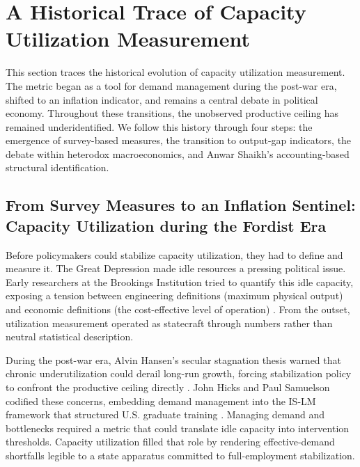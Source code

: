 \documentclass[11pt]{article}
\begin{document}
\section{A Historical Trace of Capacity Utilization Measurement}
\label{sec:literature_review}

This section traces the historical evolution of capacity utilization measurement. The metric began as a tool for demand management during the post-war era, shifted to an inflation indicator, and remains a central debate in political economy. Throughout these transitions, the unobserved productive ceiling has remained underidentified. We follow this history through four steps: the emergence of survey-based measures, the transition to output-gap indicators, the debate within heterodox macroeconomics, and Anwar Shaikh’s accounting-based structural identification.

\subsection{From Survey Measures to an Inflation Sentinel: Capacity Utilization during the Fordist Era}
\label{subsec:fordist_survey_statecraft}

Before policymakers could stabilize capacity utilization, they had to define and measure it. The Great Depression made idle resources a pressing political issue. Early researchers at the Brookings Institution tried to quantify this idle capacity, exposing a tension between engineering definitions (maximum physical output) and economic definitions (the cost-effective level of operation) \citep{Burns1954, KleinDavid1958}. From the outset, utilization measurement operated as statecraft through numbers rather than neutral statistical description.

During the post-war era, Alvin Hansen's secular stagnation thesis warned that chronic underutilization could derail long-run growth, forcing stabilization policy to confront the productive ceiling directly \citep{Hansen1936, Hansen1941, Barber1987}. John Hicks and Paul Samuelson codified these concerns, embedding demand management into the IS-LM framework that structured U.S. graduate training \citep{Hicks1937, Samuelson1947, Samuelson1948}. Managing demand and bottlenecks required a metric that could translate idle capacity into intervention thresholds. Capacity utilization filled that role by rendering effective-demand shortfalls legible to a state apparatus committed to full-employment stabilization.
\end{document}
